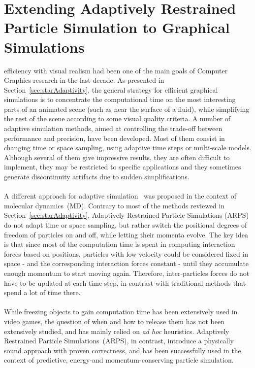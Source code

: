 \chapter[Extending ARPS to Graphical Simulations]{Extending Adaptively Restrained Particle Simulation to Graphical Simulations}
\label{chap:arps}

 efficiency with visual realism had been one of the main goals of Computer Graphics research in the last decade. As presented in Section~\ref{sec:starAdaptivity}, the general strategy for efficient graphical simulations is to concentrate the computational time on the most interesting parts of an animated scene (such as near the surface of a fluid), while simplifying the rest of the scene according to some visual quality criteria.  A number of adaptive simulation methods, aimed at controlling the trade-off between performance and precision, have been developed. Most of them consist in changing time or space sampling, using adaptive time steps or multi-scale models.
Although several of them give impressive results, they are often difficult to implement, they may be restricted to specific applications and they sometimes generate discontinuity artifacts due to sudden simplifications.
\\ \\
A different approach for adaptive simulation~\cite{Artemova2012} was proposed in the context of molecular dynamics~(MD). Contrary to most of the methods reviewed in Section~\ref{sec:starAdaptivity}, Adaptively Restrained Particle Simulations (ARPS) do not adapt time or space sampling, but rather switch the positional degrees of freedom of particles on and off, while letting their momenta evolve. The key idea is that since most of the computation time is spent in computing interaction forces based on positions, particles with low velocity could be considered fixed in space - and the corresponding interaction forces constant - until they accumulate enough momentum to start moving again. Therefore, inter-particles forces do not have to be updated at each time step, in contrast with traditional methods that spend a lot of time there.
\\ \\
While freezing objects to gain computation time has been extensively used in video games, the question of when and how to release them has not been extensively studied, and has mainly relied on \textit{ad hoc} heuristics.
Adaptively Restrained Particle Simulations~(ARPS), in contrast, introduce a physically sound approach with proven correctness, and has been successfully used in the context of predictive, energy-and momentum-conserving particle simulation.
